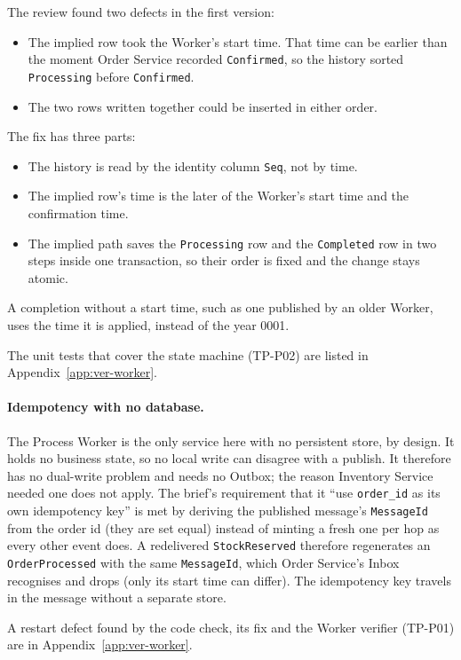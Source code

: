 \documentclass[a4paper]{report}
\begin{document}
The review found two defects in the first version:
\begin{itemize}
  \item The implied row took the Worker's start time. That time can be
    earlier than the moment Order Service recorded \texttt{Confirmed}, so the
    history sorted \texttt{Processing} before \texttt{Confirmed}.
  \item The two rows written together could be inserted in either order.
\end{itemize}
The fix has three parts:
\begin{itemize}
  \item The history is read by the identity column \texttt{Seq}, not by time.
  \item The implied row's time is the later of the Worker's start time and
    the confirmation time.
  \item The implied path saves the \texttt{Processing} row and the
    \texttt{Completed} row in two steps inside one transaction, so their
    order is fixed and the change stays atomic.
\end{itemize}
A completion without a start time, such as one published by an older Worker,
uses the time it is applied, instead of the year 0001.

The unit tests that cover the state machine (TP-P02) are listed in Appendix~\ref{app:ver-worker}.

\paragraph{Idempotency with no database.} The Process Worker is the only
service here with no persistent store, by design. It holds no business state,
so no local write can disagree with a publish. It therefore has no dual-write
problem and needs no Outbox; the reason Inventory Service needed one does not
apply. The brief's requirement that it ``use \texttt{order\_id} as its own
idempotency key'' is met by deriving the published message's
\texttt{MessageId} from the order id (they are set equal) instead of minting
a fresh one per hop as every other event does. A redelivered
\texttt{StockReserved} therefore regenerates an \texttt{OrderProcessed} with
the same \texttt{MessageId}, which Order Service's Inbox recognises and drops
(only its start time can differ). The idempotency key travels in the message
without a separate store.

A restart defect found by the code check, its fix and the Worker verifier (TP-P01) are in Appendix~\ref{app:ver-worker}.
\end{document}
